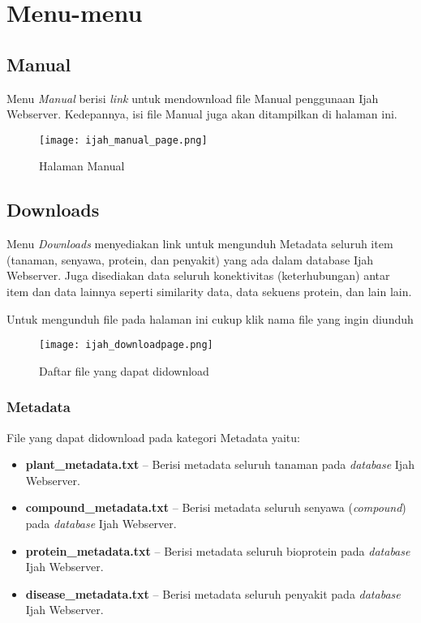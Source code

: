 \chapter{Menu-menu}  \label{chap:Menu}

\section{Manual}
Menu \emph{Manual} berisi \emph{link} untuk mendownload file Manual penggunaan Ijah Webserver. Kedepannya, isi file Manual juga akan ditampilkan di halaman ini.

\begin{figure}[H]
	\centering
	\texttt{[image: ijah\_manual\_page.png]}
	\caption{Halaman Manual}
	\label{fig:ijah_manual_page}
\end{figure}

\section{Downloads} \label{Downloads}
Menu \emph{Downloads} menyediakan link untuk mengunduh Metadata seluruh item (tanaman, senyawa, protein, dan penyakit) yang ada dalam database Ijah Webserver. Juga disediakan data seluruh konektivitas (keterhubungan) antar item dan data lainnya seperti similarity data, data sekuens protein, dan lain lain.

Untuk mengunduh file pada halaman ini cukup klik nama file yang ingin diunduh

\begin{figure}[H]
	\centering
	\texttt{[image: ijah\_downloadpage.png]}
	\caption{Daftar file yang dapat di\-download}
	\label{fig:ijah_downloadpage}
\end{figure}

	\subsection{Metadata}
	File yang dapat didownload pada kategori Metadata yaitu:

	\begin{itemize}
	\item \textbf{plant\_metadata.txt} -- Berisi metadata seluruh tanaman pada \emph{database} Ijah Webserver. 
	\item \textbf{compound\_metadata.txt} -- Berisi metadata seluruh senyawa (\emph{compound}) pada \emph{database} Ijah Webserver.
	\item \textbf{protein\_metadata.txt} -- Berisi metadata seluruh bioprotein pada \emph{database} Ijah Webserver.
	\item \textbf{disease\_metadata.txt} -- Berisi metadata seluruh penyakit pada \emph{database} Ijah Webserver.
	\end{itemize}

